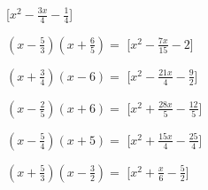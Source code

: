 \begin{esercizio}
\begin{multicols}{2}
\begin{enumeratea}
  \hfill [\(x^{2} - \frac{3 x}{4} - \frac{1}{4}\)]
\item \(\left(x - \frac{5}{3}\right)\left(x + \frac{6}{5}\right)=\)
  \hfill [\(x^{2} - \frac{7 x}{15} - 2\)]
\item \(\left(x + \frac{3}{4}\right)\left(x - 6\right)=\)
  \hfill [\(x^{2} - \frac{21 x}{4} - \frac{9}{2}\)]
\item \(\left(x - \frac{2}{5}\right)\left(x + 6\right)=\)
  \hfill [\(x^{2} + \frac{28 x}{5} - \frac{12}{5}\)]
\item \(\left(x - \frac{5}{4}\right)\left(x + 5\right)=\)
  \hfill [\(x^{2} + \frac{15 x}{4} - \frac{25}{4}\)]
\item \(\left(x + \frac{5}{3}\right)\left(x - \frac{3}{2}\right)=\)
  \hfill [\(x^{2} + \frac{x}{6} - \frac{5}{2}\)]
\end{enumeratea}
\end{multicols}
\end{esercizio}


